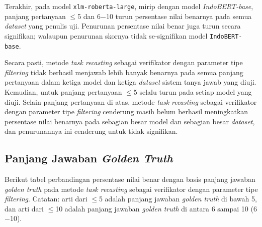 Terakhir, pada model \texttt{xlm-roberta-large}, mirip dengan model \emph{IndoBERT-base}, panjang pertanyaan $\leq$5 dan 6$-$10 turun persentase nilai benarnya pada semua \emph{dataset} yang penulis uji. Penurunan persentase nilai benar juga turun secara signifikan; walaupun penurunan skornya tidak se-signifikan model \texttt{IndoBERT-base}.

Secara pasti, metode \emph{task recasting} sebagai verifikator dengan parameter tipe \emph{filtering} tidak berhasil menjawab lebih banyak benarnya pada semua panjang pertanyaan dalam ketiga model dan ketiga \emph{dataset} sistem tanya jawab yang diuji. Kemudian, untuk panjang pertanyaan $\leq$5 selalu turun pada setiap model yang diuji. Selain panjang pertanyaan di atas, metode \emph{task recasting} sebagai verifikator dengan parameter tipe \emph{filtering} cenderung masih belum berhasil meningkatkan persentase nilai benarnya pada sebagian besar model dan sebagian besar \emph{dataset}, dan penurunannya ini cenderung untuk tidak signifikan.

\subsection{Panjang Jawaban \emph{Golden Truth}}
Berikut tabel perbandingan persentase nilai benar dengan basis panjang jawaban \emph{golden truth} pada metode \emph{task recasting} sebagai verifikator dengan parameter tipe \emph{filtering}. Catatan: arti dari $\leq$5 adalah panjang jawaban \emph{golden truth} di bawah 5, dan arti dari $\leq$10 adalah panjang jawaban \emph{golden truth} di antara 6 sampai 10 (6$-$10).


